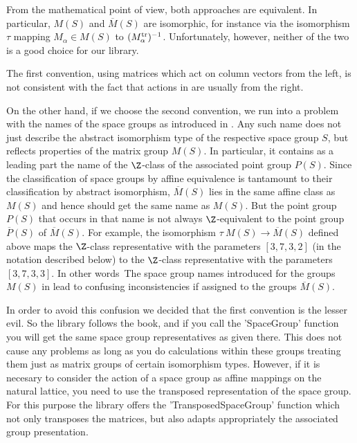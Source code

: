 From the  mathematical point of  view, both approaches are equivalent. In
particular, $M(S)$ and $\overline{M}(S)$ are isomorphic, for instance via
the isomorphism $\tau$  mapping  $M_\alpha \in  M(S)$  to $(M_\alpha^{\rm
tr})^{-1}$.  Unfortunately, however,  neither of the two is a good choice
for our {\GAP} library.

The first convention, using matrices which act on column vectors from the
left, is not consistent with the fact that  actions in {\GAP} are usually
from the right.

On the  other hand, if we choose  the second  convention,  we run  into a
problem  with  the  names   of  the space     groups   as introduced   in
\cite{BBNWZ78}. Any  such   name  does not  just  describe  the  abstract
isomorphism  type  of  the   respective space   group  $S$, but  reflects
properties of the  matrix group $M(S)$.  In particular,  it contains as a
leading part  the  name of the  $\Z$-class of  the associated point group
$P(S)$.  Since  the classification of  space groups by affine equivalence
is   tantamount  to   their  classification   by  abstract   isomorphism,
$\overline{M}(S)$  lies in  the  same affine   class as $M(S)$  and hence
should get  the same name   as $M(S)$.  But  the  point group $P(S)$ that
occurs  in  that name is  not always  $\Z$-equivalent to the  point group
$\overline{P}(S)$  of $\overline{M}(S)$.   For example,  the  isomorphism
$\tau\!\!\:  M(S)  \rightarrow  \overline{M}(S)$ defined  above  maps the
$\Z$-class  representative    with  the parameters $[3,7,3,2]$    (in the
notation   described below)  to  the $\Z$-class   representative with the
parameters $[3,7,3,3]$.  In    other  words\:\ The space     group  names
introduced for  the  groups $M(S)$ in  \cite{BBNWZ78}   lead to confusing
inconsistencies if assigned to the groups $\overline{M}(S)$.

In order to avoid this confusion we  decided that the first convention is
the lesser evil.  So the {\GAP} library follows the book, and if you call
the  'SpaceGroup'  function    you   will  get  the  same     space group
representatives as given there.  This does not cause any problems as long
as  you do calculations within these  groups treating them just as matrix
groups  of  certain isomorphism  types.   However, if  it is  necesary to
consider the action  of a space group  as affine mappings on the  natural
lattice,  you  need to  use the   transposed representation of  the space
group.   For this purpose  the library  offers the 'TransposedSpaceGroup'
function which   not  only transposes  the   matrices, but  also   adapts
appropriately the associated group presentation.

